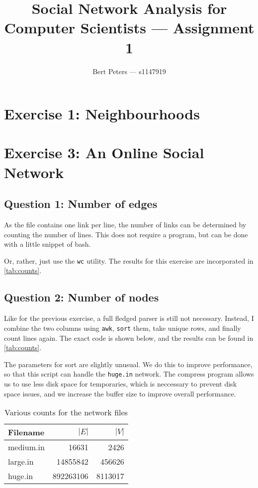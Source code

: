 \documentclass[12pt,a4paper,hidelinks]{article}
\author{Bert Peters --- s1147919}
\title{Social Network Analysis for Computer Scientists --- Assignment 1}
\begin{document}
\maketitle

\section{Exercise 1: Neighbourhoods}

\section{Exercise 3: An Online Social Network}

\subsection{Question 1: Number of edges}

As the file contains one link per line, the number of links can be determined by counting the number of lines. This does not require a program, but can be done with a little snippet of bash.



Or, rather, just use the \texttt{wc} utility. The results for this exercise are incorporated in \autoref{tab:counts}.

\subsection{Question 2: Number of nodes}

Like for the previous exercise, a full fledged parser is still not necessary. Instead, I combine the two columns using \texttt{awk}, \texttt{sort} them, take unique rows, and finally count lines again. The exact code is shown below, and the results can be found in \autoref{tab:counts}.



The parameters for sort are slightly unusual. We do this to improve performance, so that this script can handle the \texttt{huge.in} network. The compress program allows us to use less disk space for temporaries, which is neccessary to prevent disk space issues, and we increase the buffer size to improve overall performance.

\begin{table}
\centering
\begin{tabular}{l | r | r}
Filename & {\centering $|E|$} & $|V|$ \\
\hline
medium.in & 16631 & 2426 \\
large.in & 14855842 & 456626 \\
huge.in & 892263106 & 8113017
\end{tabular}

\caption{Various counts for the network files}
\label{tab:counts}
\end{table}
\end{document}
